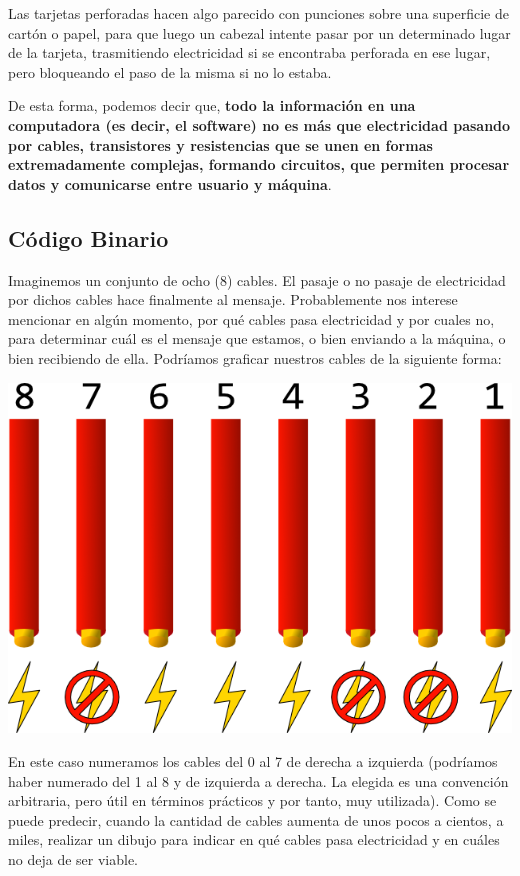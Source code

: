 Las tarjetas perforadas hacen algo parecido con punciones sobre una superficie
de cartón o papel, para que luego un cabezal intente pasar por un determinado 
lugar de la tarjeta, trasmitiendo electricidad si se encontraba perforada en
ese lugar, pero bloqueando el paso de la misma si no lo estaba.

De esta forma, podemos decir que, \textbf{todo la información en una computadora
(es decir, el software) no es más que electricidad pasando por cables, transistores
y resistencias que se unen en formas extremadamente complejas, formando circuitos,
que permiten procesar datos y comunicarse entre usuario y máquina}.\autocite[part. 2]{white_2015}


\subsection{Código Binario}

Imaginemos un conjunto de ocho (8) cables. El pasaje o no pasaje de electricidad
por dichos cables hace finalmente al mensaje. Probablemente nos interese
mencionar en algún momento, por qué cables pasa electricidad y por cuales no, para
determinar cuál es el mensaje que estamos, o bien enviando a la máquina, o bien
recibiendo de ella. Podríamos graficar nuestros cables de la siguiente forma:

\centerline{\includegraphics[]{capitulos/bajo_nivel/imagenes/cables_electricity.png}}

En este caso numeramos los cables del 0 al 7 de derecha a izquierda (podríamos
haber numerado del 1 al 8 y de izquierda a derecha. La elegida es una convención
arbitraria, pero útil en términos prácticos y por tanto, muy utilizada). Como se
puede predecir, cuando la cantidad de cables aumenta de unos pocos a cientos, a
miles, realizar un dibujo para indicar en qué cables pasa electricidad y en cuáles
no deja de ser viable.

